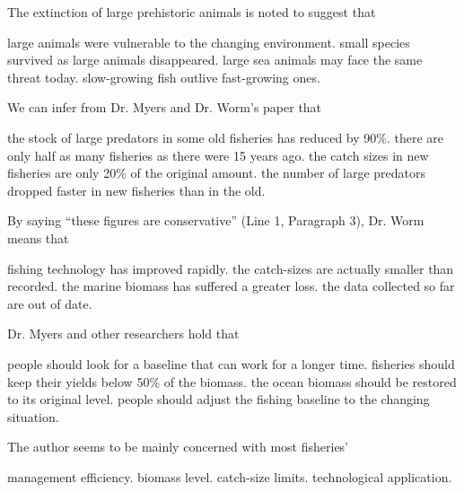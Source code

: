 \item The extinction of large prehistoric animals is noted to suggest that
\begin{tasks}
	\task large animals were vulnerable to the changing environment.
	\task small species survived as large animals disappeared.
	\task large sea animals may face the same threat today.
	\task slow-growing fish outlive fast-growing ones.
\end{tasks}
\item We can infer from Dr. Myers and Dr. Worm's paper that
\begin{tasks}
	\task the stock of large predators in some old fisheries has reduced by 90\%.
	\task there are only half as many fisheries as there were 15 years ago.
	\task the catch sizes in new fisheries are only 20\% of the original amount.
	\task the number of large predators dropped faster in new fisheries than in the old.
\end{tasks}
\item By saying ``these figures are conservative'' (Line 1, Paragraph 3), Dr. Worm means that
\begin{tasks}
	\task fishing technology has improved rapidly.
	\task the catch-sizes are actually smaller than recorded.
	\task the marine biomass has suffered a greater loss.
	\task the data collected so far are out of date.
\end{tasks}
\item Dr. Myers and other researchers hold that
\begin{tasks}
	\task people should look for a baseline that can work for a longer time.
	\task fisheries should keep their yields below 50\% of the biomass.
	\task the ocean biomass should be restored to its original level.
	\task people should adjust the fishing baseline to the changing situation.
\end{tasks}
\item The author seems to be mainly concerned with most fisheries'
\begin{tasks}
	\task management efficiency.
	\task biomass level.
	\task catch-size limits.
	\task technological application.
\end{tasks}